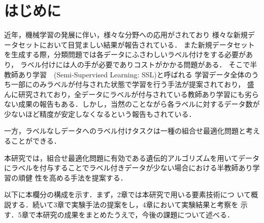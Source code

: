 \newpage
\changeindent{0cm}
\section{はじめに}
\changeindent{2cm}
近年，機械学習の発展に伴い，様々な分野への応用がされており
様々な新規データセットにおいて目覚ましい結果が報告されている．
また新規データセットを生成する際，分類問題では各データにふさわしいラベル付けをする必要があり，
ラベル付けには人の手が必要でありコストがかかる問題がある．
そこで半教師あり学習　(Semi-Supervised Learning: SSL)と呼ばれる
学習データ全体のうち一部にのみラベルが付与された状態で学習を行う手法が提案されており，
盛んに研究されており，全データにラベルが付与されている教師あり学習にも劣らない成果の報告\cite{sohn2020fixmatch}もある．しかし，当然のことながら各ラベルに対するデータ数が少ないほど精度が安定しなくなるという報告もされている．

一方，ラベルなしデータへのラベル付けタスクは一種の組合せ最適化問題と考えることができる．

本研究では，組合せ最適化問題に有効である遺伝的アルゴリズムを用いてデータにラベルを付与することでラベル付きデータが少ない場合における半教師あり学習の頑健
性を高める手法を提案する．

以下に本欄分の構成を示す．まず，2章では本研究で用いる要素技術につ
いて概説する．続いて3章で実験手法の提案をし，4章において実験結果と考察を
示す．5章で本研究の成果をまとめたうえで，今後の課題について述べる．

